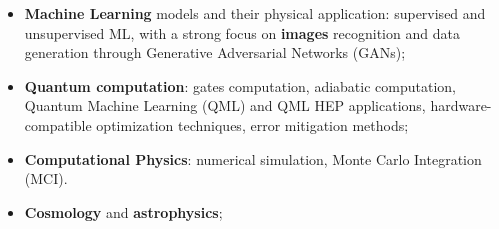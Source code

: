 %
%
%

\par{
\begin{itemize}
    \item \textbf{Machine Learning} models and their physical application: supervised 
    and unsupervised ML, with a strong focus on \textbf{images} recognition and
    data generation through Generative Adversarial Networks (GANs);
    \item \textbf{Quantum computation}: gates computation, adiabatic computation, Quantum 
    Machine Learning (QML) and QML HEP applications, hardware-compatible optimization 
    techniques, error mitigation methods;
    \item \textbf{Computational Physics}: numerical simulation, Monte Carlo 
    Integration (MCI).
    \item \textbf{Cosmology} and \textbf{astrophysics};
\end{itemize} 
}

\vspace{0.2cm}